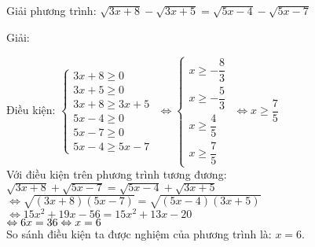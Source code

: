
         
      
          \begin{vd}
              Giải phương trình: $\sqrt{3x+8} - \sqrt{3x+5} = \sqrt{5x-4} - \sqrt{5x-7}$
          \end{vd}
          \begin{center}

            Giải:
         \end{center}

		 Điều kiện: 
         $
         \begin{cases}
           3x + 8 \geq 0 \\
           3x + 5 \geq 0 \\
           3x + 8 \geq 3x + 5 \\
           5x -4 \geq 0 \\
           5x -7 \geq 0 \\
           5x -4 \geq 5x -7
         \end{cases}
         $
         $ \Leftrightarrow 
            \begin{cases}
              x \geq - \dfrac{8}{3} \\
              x \geq - \dfrac{5}{3} \\
              x \geq \dfrac{4}{5} \\
              x \geq \dfrac{7}{5}
            \end{cases}
        $
        $ \Leftrightarrow x \geq \dfrac{7}{5} $ \\
        Với điều kiện trên phương trình tương đương: \\
        $\sqrt{3x+8} +  \sqrt{5x-7}  = \sqrt{5x-4} + \sqrt{3x+5}$ \\
    $\Leftrightarrow  \sqrt{(3x+8)(5x-7)} = \sqrt{(5x-4)(3x+5)}$ \\
    $ \Leftrightarrow 15x^2 +19x -56 = 15x^2 +13x -20 $ \\
    $ \Leftrightarrow 6x = 36 \\ \Leftrightarrow x=6$ \\
    So sánh điều kiện ta được nghiệm của phương trình là: $x=6$.
